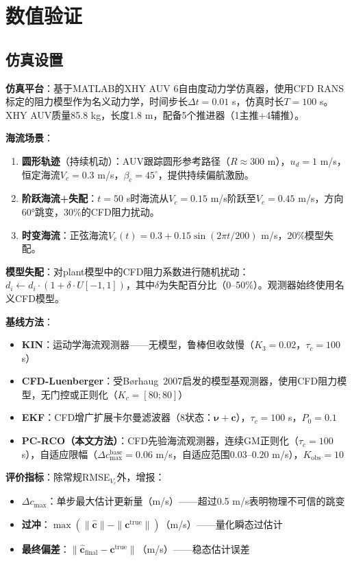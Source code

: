 \section{数值验证}

\subsection{仿真设置}

\textbf{仿真平台}：基于MATLAB的XHY AUV 6自由度动力学仿真器，使用CFD RANS标定的阻力模型作为名义动力学，时间步长$\Delta t=0.01$ s，仿真时长$T=100$ s。XHY AUV质量85.8 kg，长度1.8 m，配备5个推进器（1主推+4辅推）。

\textbf{海流场景}：
\begin{enumerate}[itemsep=0pt,topsep=4pt]
    \item \textbf{圆形轨迹}（持续机动）：AUV跟踪圆形参考路径（$R\approx300$ m），$u_d=1$ m/s，恒定海流$V_c=0.3$ m/s，$\beta_c=45^\circ$，提供持续偏航激励。
    \item \textbf{阶跃海流+失配}：$t=50$ s时海流从$V_c=0.15$ m/s阶跃至$V_c=0.45$ m/s，方向60°跳变，30\%的CFD阻力扰动。
    \item \textbf{时变海流}：正弦海流$V_c(t)=0.3+0.15\sin(2\pi t/200)$ m/s，20\%模型失配。
\end{enumerate}

\textbf{模型失配}：对plant模型中的CFD阻力系数进行随机扰动：$d_i \leftarrow d_i \cdot (1 + \delta \cdot U[-1,1])$，其中$\delta$为失配百分比（0--50\%）。观测器始终使用名义CFD模型。

\textbf{基线方法}：
\begin{itemize}[itemsep=0pt,topsep=4pt]
    \item \textbf{KIN}：运动学海流观测器\cite{liang2018three}——无模型，鲁棒但收敛慢（$K_3=0.02$，$\tau_c=100$ s）
    \item \textbf{CFD-Luenberger}：受Børhaug~2007\cite{borhaug2007model}启发的模型基观测器，使用CFD阻力模型，无门控或正则化（$K_c=[80;80]$）
    \item \textbf{EKF}\cite{long2021trajectory}：CFD增广扩展卡尔曼滤波器（8状态：$\bm{\nu}+\bm{c}$），$\tau_c=100$ s，$P_0=0.1$
    \item \textbf{PC-RCO（本文方法）}：CFD先验海流观测器，连续GM正则化（$\tau_c=100$ s），自适应限幅（$\Delta c_{\max}^{\text{base}}=0.06$ m/s，自适应范围$0.03$--$0.20$ m/s），$K_{\text{obs}}=10$
\end{itemize}

\textbf{评价指标}：除常规RMSE$_{V_c}$外，增报：
\begin{itemize}[itemsep=0pt,topsep=4pt]
    \item \textbf{$\Delta c_{\max}$}：单步最大估计更新量（m/s）——超过0.5 m/s表明物理不可信的跳变
    \item \textbf{过冲}：$\max(\|\hat{\bm{c}}\| - \|\bm{c}^{\text{true}}\|)$（m/s）——量化瞬态过估计
    \item \textbf{最终偏差}：$\|\hat{\bm{c}}_{\text{final}} - \bm{c}^{\text{true}}\|$（m/s）——稳态估计误差
\end{itemize}

